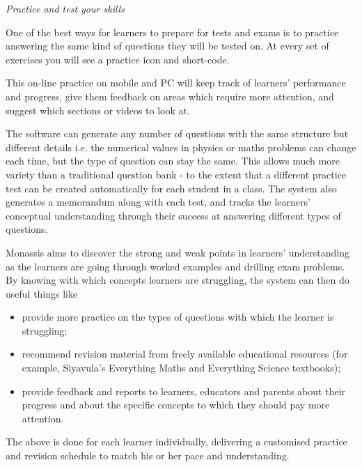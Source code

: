 \newpage
\thispagestyle{empty}
{\Large


{\normalfont\sffamily\fontsize{22}\normalfont\itshape Practice and test your skills} \par

One of the best ways for learners to prepare for tests and exams is to practice answering the same kind of questions they will be tested on. At every set of exercises you will see a practice icon and short-code. \par

This on-line practice on mobile and PC will keep track of learners' performance and progress, give them feedback on areas which require more attention, and suggest which sections or videos to look at.\par

The software can generate any number of questions with the same structure but different details i.e. the numerical values in physics or maths problems can change each time, but the type of question can stay the same. This allows much more variety than a traditional question bank - to the extent that a different practice test can be created automatically for each student in a class. The system also generates a memorandum along with each test, and tracks the learners' conceptual understanding through their success at answering different types of questions.\par
Monassis aims to discover the strong and weak points in learners' understanding as the learners are going through worked examples and drilling exam problems. By knowing with which concepts learners are struggling, the system can then do useful things like
\begin{itemize}[noitemsep]
\item provide more practice on the types of questions with which the learner is struggling;
\item recommend revision material from freely available educational resources (for example,  Siyavula's Everything Maths and Everything Science textbooks);
\item provide feedback and reports to learners, educators and parents about their progress and about the specific concepts to which they should pay more attention.
\end{itemize}
 The above is done for each learner individually, delivering a customised practice and revision schedule to match his or her pace and understanding.


}
